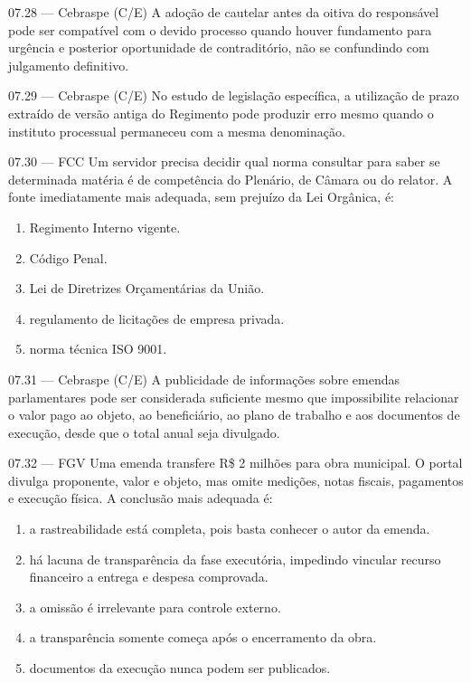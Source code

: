 \begin{questao}{ 07.28 — Cebraspe (C/E)}
A adoção de cautelar antes da oitiva do responsável pode ser compatível com o devido processo quando houver fundamento para urgência e posterior oportunidade de contraditório, não se confundindo com julgamento definitivo.
\end{questao}

\begin{questao}{ 07.29 — Cebraspe (C/E)}
No estudo de legislação específica, a utilização de prazo extraído de versão antiga do Regimento pode produzir erro mesmo quando o instituto processual permaneceu com a mesma denominação.
\end{questao}

\begin{questao}{ 07.30 — FCC}
Um servidor precisa decidir qual norma consultar para saber se determinada matéria é de competência do Plenário, de Câmara ou do relator. A fonte imediatamente mais adequada, sem prejuízo da Lei Orgânica, é:
\begin{enumerate}[label=\Alph*)]
\item Regimento Interno vigente.
\item Código Penal.
\item Lei de Diretrizes Orçamentárias da União.
\item regulamento de licitações de empresa privada.
\item norma técnica ISO 9001.
\end{enumerate}
\end{questao}

\begin{questao}{ 07.31 — Cebraspe (C/E)}
A publicidade de informações sobre emendas parlamentares pode ser considerada suficiente mesmo que impossibilite relacionar o valor pago ao objeto, ao beneficiário, ao plano de trabalho e aos documentos de execução, desde que o total anual seja divulgado.
\end{questao}

\begin{questao}{ 07.32 — FGV}
Uma emenda transfere R\$ 2 milhões para obra municipal. O portal divulga proponente, valor e objeto, mas omite medições, notas fiscais, pagamentos e execução física. A conclusão mais adequada é:
\begin{enumerate}[label=\Alph*)]
\item a rastreabilidade está completa, pois basta conhecer o autor da emenda.
\item há lacuna de transparência da fase executória, impedindo vincular recurso financeiro a entrega e despesa comprovada.
\item a omissão é irrelevante para controle externo.
\item a transparência somente começa após o encerramento da obra.
\item documentos da execução nunca podem ser publicados.
\end{enumerate}
\end{questao}

